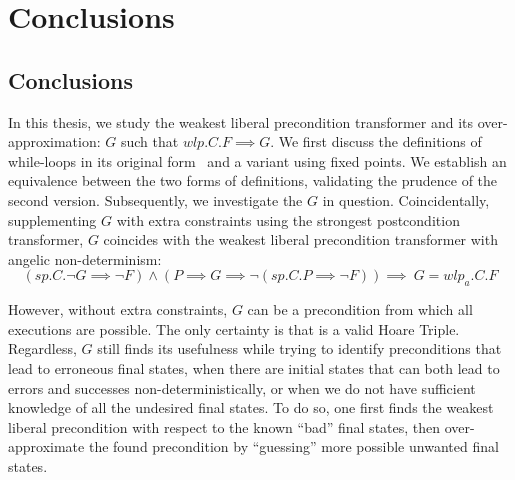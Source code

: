 \chapter{Conclusions}\label{ch:conclusion} %

\section{Conclusions}
In this thesis, we study the weakest liberal precondition transformer and its over-approximation: $G$ such that $wlp.C.F\implies G$. 
We first discuss the definitions of while-loops in its original form~\cite{dijkstra75} and a variant using fixed points. 
We establish an equivalence between the two forms of definitions, validating the prudence of the second version. 
Subsequently, we investigate the $G$ in question. 
Coincidentally, supplementing $G$ with extra constraints using the strongest postcondition transformer, $G$ coincides with the weakest liberal precondition transformer with angelic non-determinism: 
$$(sp.C.\neg G {\implies} \neg F) \wedge
(P{\implies} G \implies \neg(sp.C.P {\implies} \neg F) )
\implies\ G = wlp_a.C.F$$

However, without extra constraints, $G$ can be a precondition from which all executions are possible. 
The only certainty is that  is a valid Hoare Triple. 
Regardless, $G$ still finds its usefulness while trying to identify preconditions that lead to erroneous final states, when there are initial states that can both lead to errors and successes non-deterministically, or when we do not have sufficient knowledge of all the undesired final states. 
To do so, one first finds the weakest liberal precondition with respect to the known ``bad'' final states, then over-approximate the found precondition by ``guessing'' more possible unwanted final states. 

